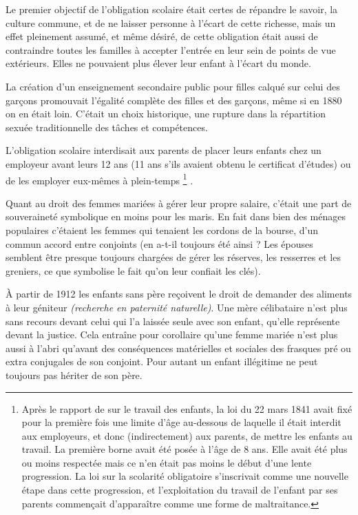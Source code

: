 { Le premier objectif de l'obligation scolaire était certes de répandre le savoir, la culture commune, et de ne laisser personne à l'écart de cette richesse, mais un effet pleinement assumé, et même désiré, de cette obligation était aussi de contraindre toutes les familles à accepter l'entrée en leur sein de points de vue extérieurs. Elles ne pouvaient plus élever leur enfant à l'écart du monde. 

 La création d'un enseignement secondaire public pour filles calqué sur celui des garçons promouvait l'égalité complète des filles et des garçons, même si en 1880 on en était loin. C'était un choix historique, une rupture dans la répartition sexuée traditionnelle des tâches et compétences. 

 L'obligation scolaire interdisait aux parents de placer leurs enfants chez un employeur avant leurs 12 ans (11 ans s'ils avaient obtenu le certificat d'études) ou de les employer eux-mêmes à plein-temps%
\footnote{Après le rapport de  sur le travail des enfants, la loi du 22 mars 1841 avait fixé pour la première fois une limite d'âge au-dessous de laquelle il était interdit aux employeurs, et donc (indirectement) aux parents, de mettre les enfants au travail. La première borne avait été posée à l'âge de 8 ans. Elle avait été plus ou moins respectée mais ce n'en était pas moins le début d'une lente progression. La loi sur la scolarité obligatoire s'inscrivait comme une nouvelle étape dans cette progression, et l'exploitation du travail de l'enfant par ses parents commençait d'apparaître comme une forme de maltraitance.}%
. 

 Quant au droit des femmes mariées à gérer leur propre salaire, c'était une part de souveraineté symbolique en moins pour les maris. En fait dans bien des ménages populaires c'étaient les femmes qui tenaient les cordons de la bourse, d'un commun accord entre conjoints (en a-t-il toujours été ainsi ? Les épouses semblent être presque toujours chargées de gérer les réserves, les resserres et les greniers, ce que symbolise le fait qu'on leur confiait les clés).

 À partir de 1912 les enfants sans père reçoivent le droit de demander des aliments à leur géniteur \emph{(recherche en paternité naturelle)}. Une mère célibataire n'est plus sans recours devant celui qui l'a laissée seule avec son enfant, qu'elle représente devant la justice. Cela entraîne pour corollaire qu'une femme mariée n'est plus aussi à l'abri qu'avant des conséquences matérielles et sociales des frasques pré ou extra conjugales de son conjoint. Pour autant un enfant illégitime ne peut toujours pas hériter de son père. 


}
